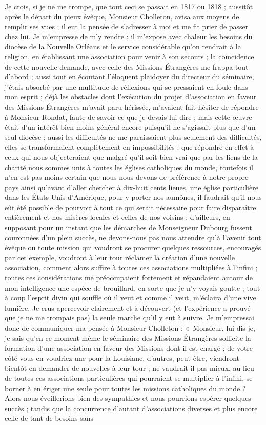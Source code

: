 \documentclass[11pt,a4paper]{report}
\begin{document}
Je crois, si je ne me trompe, que tout ceci se passait en 1817 ou 1818 ; aussitôt après le départ du pieux évêque, Monsieur Cholleton, avisa aux moyens de remplir ses vues ; il eut la pensée de s'adresser à moi et me fit prier de passer chez lui. Je m'empresse de m'y rendre ; il m'expose avec chaleur les besoins du diocèse de la Nouvelle Orléans et le service considérable qu'on rendrait à la religion, en établissant une association pour venir à son secours ; la coïncidence de cette nouvelle demande, avec celle des Missions Étrangères me frappa tout d'abord ; aussi tout en écoutant l'éloquent plaidoyer du directeur du séminaire, j'étais absorbé par une multitude de réflexions qui se pressaient en foule dans mon esprit ; déjà les obstacles dont l'exécution du projet d'association en faveur des Missions Étrangères m'avait paru hérissée, m'avaient fait hésiter de répondre à Monsieur Rondat, faute de savoir ce que je devais lui dire ; mais cette œuvre était d'un intérêt bien moins général encore puisqu'il ne s'agissait plus que d'un seul diocèse ; aussi les difficultés ne me paraissaient plus seulement des difficultés, elles se transformaient complètement en impossibilités ; que répondre en effet à ceux qui nous objecteraient que malgré qu'il soit bien vrai que par les liens de la charité nous sommes unis à toutes les églises catholiques du monde, toutefois il n'en est pas moins certain que nous nous devons de préférence à notre propre pays ainsi qu'avant d'aller chercher à dix-huit cents lieues, une église particulière dans les États-Unis d'Amérique, pour y porter nos aumônes, il faudrait qu'il nous eût été possible de pourvoir à tout ce qui serait nécessaire pour faire disparaître entièrement et nos misères locales et celles de nos voisins ; d'ailleurs, en supposant pour un instant que les démarches de Monseigneur Dubourg fussent couronnées d'un plein succès, ne devons-nous pas nous attendre qu'à l'avenir tout évêque ou toute mission qui voudront se procurer quelques ressources, encouragés par cet exemple, voudront à leur tour réclamer la création d'une nouvelle association, comment alors suffire à toutes ces associations multipliées à l'infini ; toutes ces considérations me préoccupaient fortement et répandaient autour de mon intelligence une espèce de brouillard, en sorte que je n'y voyais goutte ; tout à coup l'esprit divin qui souffle où il veut et comme il veut, m'éclaira d'une vive lumière. Je crus apercevoir clairement et à découvert (et l'expérience a prouvé que je ne me trompais pas) la seule marche qu'il y eut à suivre. Je m'empressai donc de communiquer ma pensée à Monsieur Cholleton : «~Monsieur, lui dis-je, je sais qu'en ce moment même le séminaire des Missions Étrangères sollicite la formation d'une association en faveur des Missions dont il est chargé ; de votre côté vous en voudriez une pour la Louisiane, d'autres, peut-être, viendront bientôt en demander de nouvelles à leur tour ; ne vaudrait-il pas mieux, au lieu de toutes ces associations particulières qui pourraient se multiplier à l'infini, se borner à en ériger une seule pour toutes les missions catholiques du monde ? Alors nous éveillerions bien des sympathies et nous pourrions espérer quelques succès ; tandis que la concurrence d'autant d'associations diverses et plus encore celle de tant de besoins sans 
\end{document}
